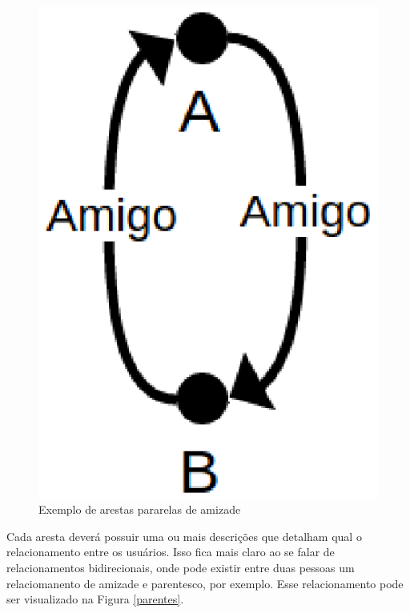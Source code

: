 \begin{figure}[!h]
	\centering
	\includegraphics[scale=0.45]{figuras/capitulo5/amigo.eps}
	\caption{Exemplo de arestas pararelas de amizade}
	\label{amigo}
\end{figure}

Cada aresta deverá possuir uma ou mais descrições que detalham qual o relacionamento entre os usuários. Isso fica mais claro ao se falar de relacionamentos bidirecionais, onde pode existir entre duas pessoas um relaciomanento de amizade e parentesco, por exemplo. Esse relacionamento pode ser visualizado na Figura \ref{parentes}.

\newpage


